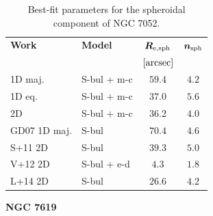 \documentclass[preprint2]{emulateapj}
\begin{document}
  \begin{table}[h]
  \small
  \caption{Best-fit parameters for the spheroidal component of NGC 7052.}
  \begin{center}
  \begin{tabular}{llcc}
  \hline
  {\bf Work} & {\bf Model}   & $\bm R_{\rm e,sph}$    & $\bm n_{\rm sph}$ \\
    &  &  $[\rm arcsec]$ & \\
  \hline
  1D maj. & S-bul + m-c & $59.4$  &  $4.2$ \\
  1D eq.  & S-bul + m-c & $37.0$  &  $5.6$ \\
  2D      & S-bul + m-c & $36.2$  &  $4.0$ \\
  \hline
  GD07 1D maj.      & S-bul & $70.4$  &  $4.6$ \\
  S+11 2D      & S-bul & $39.3$  &  $5.0$ \\
  V+12 2D      & S-bul + e-d & $4.3$  &  $1.8$ \\
  L+14 2D      & S-bul & $26.6$  &  $4.2$ \\
  \hline
  \end{tabular}
  \end{center}
  \label{tab:n7052}
  \end{table}


  \clearpage\newpage\noindent
  {\bf NGC 7619 \\}
\end{document}
